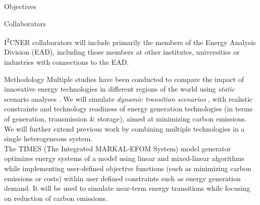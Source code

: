 \documentclass[final]{beamer}
\newlength{\onecolwid}
\newlength{\threecolwid}
\begin{document}
\begin{frame}[t]
\begin{columns}[t,totalwidth=\threecolwid]
\begin{column}{\onecolwid}
\begin{alertblock}{Objectives}
\end{alertblock}

\begin{block}{Collaborators}

I\textsuperscript{2}CNER collaborators will include primarily the members of the Energy Analysis Division (EAD), including those members at other institutes, universities or industries with connections to the EAD.   
 
\end{block}


\begin{block}{Methodology}
Multiple studies have been conducted to compare the impact of innovative energy technologies in different regions of the world using \textit{static} scenario analyses \cite{chyong_chi_dynamics_2009} \cite{feng_system_2013} \cite{kikuchi_simulation-based_2017} \cite{li_energy_2010} \cite{pambudi_impact_2017} \cite{pambudi_future_2016}. We will simulate \textit{dynamic transition scenarios} \cite{jebaraj_review_2006} \cite{pfenninger_energy_2014} , with realistic constraints and technology readiness of energy generation technologies (in terms of generation, transmission \& storage), aimed at minimizing carbon emissions. We will further extend previous work by combining multiple technologies in a single heterogeneous system.\\

The TIMES (The Integrated MARKAL-EFOM System) model generator \cite{loulou_documentation_2005} \cite{seebregts_energy/environmental_2002} optimizes energy systems of a model using linear and mixed-linear algorithms while implementing user-defined objective functions (such as minimizing carbon emissions or costs) within user defined constraints such as energy generation demand. It will be used to simulate near-term energy transitions while focusing on reduction of carbon emissions. 


\end{block}
\end{column}
\end{columns}
\end{frame}
\end{document}
